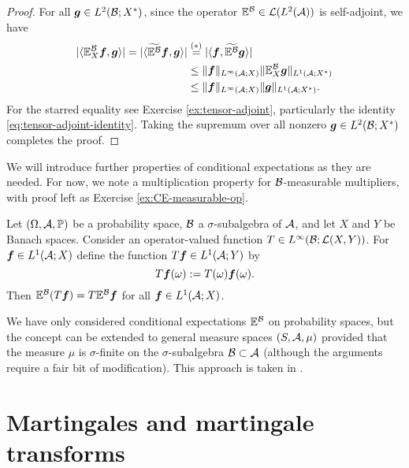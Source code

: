 \begin{proof}
   For all $\bm{g} \in L^2(\mathcal{B}; X^*)$, since the operator $\mathbb{E}^{\mathcal{B}} \in \mathcal{L}(L^2(\mathcal{A}))$ is self-adjoint, we have
\begin{equation*}
  \begin{aligned}
    | \langle \mathbb{E}_X^{\mathcal{B}} \bm{f}, \bm{g} \rangle |
    =  | \langle \widetilde{\mathbb{E}^{\mathcal{B}}} \bm{f}, \bm{g} \rangle | 
    &\stackrel{(*)}{=} | \langle \bm{f}, \widetilde{\mathbb{E}^{\mathcal{B}}} \bm{g} \rangle | \\
    &\leq  \|\bm{f}\|_{L^\infty(\mathcal{A};X)} \|\mathbb{E}_X^{\mathcal{B}} \bm{g}\|_{L^1(\mathcal{A};X^*)} \\
    &\leq  \|\bm{f}\|_{L^\infty(\mathcal{A};X)} \| \bm{g}\|_{L^1(\mathcal{A};X^*)}.
  \end{aligned}
\end{equation*}
For the starred equality see Exercise \ref{ex:tensor-adjoint}, particularly the identity \eqref{eq:tensor-adjoint-identity}.
Taking the supremum over all nonzero $\bm{g} \in L^2(\mathcal{B};X^*)$ completes the proof.
\end{proof} 

We will introduce further properties of conditional expectations as they are needed.
For now, we note a multiplication property for $\mathcal{B}$-measurable multipliers, with proof left as Exercise \ref{ex:CE-measurable-op}.

\begin{prop}\label{prop:CE-measurable-op}
  Let $(\Omega, \mathcal{A}, \mathbb{P})$ be a probability space, $\mathcal{B}$ a $\sigma$-subalgebra of $\mathcal{A}$, and let $X$ and $Y$ be Banach spaces.
  Consider an operator-valued function $T \in L^\infty(\mathcal{B}; \mathcal{L}(X,Y))$.
  For $\bm{f} \in L^1(\mathcal{A}; X)$ define the function $T\bm{f} \in L^1(\mathcal{A}; Y)$ by
  \begin{equation*}
    T\bm{f}(\omega) := T(\omega) \bm{f}(\omega).
  \end{equation*}
  Then $\mathbb{E}^{\mathcal{B}}(T\bm{f}) = T \mathbb{E}^{\mathcal{B}}\bm{f}$ for all $\bm{f} \in L^1(\mathcal{A};X)$.
\end{prop}

\begin{rmk}
  We have only considered conditional expectations $\mathbb{E}^{\mathcal{B}}$ on probability spaces, but the concept can be extended to general measure spaces $(S,\mathcal{A},\mu)$ provided that the measure $\mu$ is $\sigma$-finite on the $\sigma$-subalgebra $\mathcal{B} \subset \mathcal{A}$ (although the arguments require a fair bit of modification).
  This approach is taken in \cite{HNVW16}.
\end{rmk}

\section{Martingales and martingale transforms}

